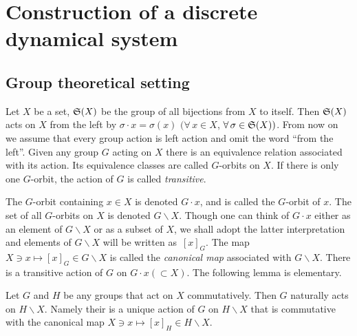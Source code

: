 \section{Construction of a discrete dynamical system}\label{sec:2}

\subsection{Group theoretical setting}\label{subsec:2_1}

Let $X$ be a set, ${\frak S}(X)$ be the group of all bijections from $X$ to itself.
Then ${\frak S}(X)$ acts on $X$ from the left by $\sigma \cdot x = \sigma (x)$
$(\forall \, x \in X$, $\forall \, \sigma \in {\frak S}(X))$.
{}From now on we assume that every group action is left action
and omit the word ``from the left''.
Given any group $G$ acting on $X$ there is an equivalence relation associated with its action.
Its equivalence classes are called $G$-orbits on $X$.
If there is only one $G$-orbit, the action of $G$ is called \textit{transitive}.

The $G$-orbit containing $x \in X$ is denoted $G \cdot x$, and is
called the $G$-orbit of $x$.
The set of all $G$-orbits on $X$ is denoted $G \backslash X$.
Though one can think of $G \cdot x$ either as an element of $G \backslash X$ or as a subset of $X$,
we shall adopt the latter interpretation and
elements of $G \backslash X$ will be written as~$[x]_G$.
The map $X \ni x \mapsto [x]_G \in G \backslash X$ is called the \textit{canonical map}
associated with $G \backslash X$.
There is a transitive action of
$G$ on $G \cdot x (\subset X)$.
The following lemma is elementary.

\begin{lemma}\label{lem:jan29_1}
Let $G$ and $H$ be any groups that act on $X$ commutatively.
Then $G$ naturally acts on $H \backslash X$.
Namely their is a unique action of $G$ on $H \backslash X$ that is commutative with
the canonical map $X \ni x \mapsto [x]_H \in H \backslash X$.
\end{lemma}

